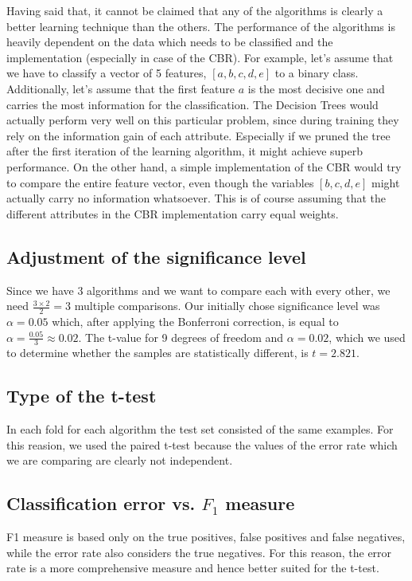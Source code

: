 \documentclass[a4paper]{article}
\begin{document}
Having said that, it cannot be claimed that any of the algorithms is clearly a better learning technique than the others. The performance of the algorithms is heavily dependent on the data which needs to be classified and the implementation (especially in case of the CBR). For example, let's assume that we have to classify a vector of 5 features, $[a,b,c,d,e]$ to a binary class. Additionally, let's assume that the first feature $a$ is the most decisive one and carries the most information for the classification. The Decision Trees would actually perform very well on this particular problem, since during training they rely on the information gain of each attribute. Especially if we pruned the tree after the first iteration of the learning algorithm, it might achieve superb performance. On the other hand, a simple implementation of the CBR would try to compare the entire feature vector, even though the variables $[b,c,d,e]$ might actually carry no information whatsoever. This is of course assuming that the different attributes in the CBR implementation carry equal weights.

\subsection{Adjustment of the significance level}

Since we have 3 algorithms and we want to compare each with every other, we need $\frac{3 \times 2}{2} = 3$ multiple comparisons. Our initially chose significance level was $\alpha = 0.05$ which, after applying the Bonferroni correction, is equal to $\alpha = \frac{0.05}{3} \approx 0.02$. The t-value for 9 degrees of freedom and $\alpha = 0.02$, which we used to determine whether the samples are statistically different, is $t = 2.821$.

\subsection{Type of the t-test}

In each fold for each algorithm the test set consisted of the same examples. For this reasion, we used the paired t-test because the values of the error rate which we are comparing are clearly not independent.

\subsection{Classification error vs. $F_1$ measure}

F1 measure is based only on the true positives, false positives and false negatives, while the error rate also considers the true negatives. For this reason, the error rate is a more comprehensive measure and hence better suited for the t-test.
\end{document}
